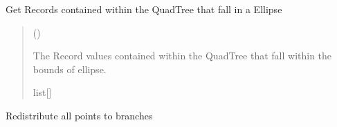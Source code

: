 \documentclass[letterpaper,10pt,english]{sphinxmanual}
\begin{document}
\begin{fulllineitems}

\begin{fulllineitems}
\label{\detokenize{quadtree:geotrees.quadtree.QuadTree.query_ellipse}}
\pysigstartsignatures
\pysiglinewithargsret
{}
{\sphinxparamcomma {}}
{}
\pysigstopsignatures
\sphinxAtStartPar
Get Records contained within the QuadTree that fall in a
Ellipse
\begin{quote}\begin{description}
\sphinxAtStartPar
{} ({\hyperref[\detokenize{shape:geotrees.shape.Ellipse}]{}})

\sphinxAtStartPar
The Record values contained within the QuadTree that fall
within the bounds of ellipse.

\sphinxAtStartPar
list{[}{\hyperref[\detokenize{record:geotrees.record.Record}]{}}{]}

\end{description}\end{quote}

\end{fulllineitems}


\begin{fulllineitems}
\label{\detokenize{quadtree:geotrees.quadtree.QuadTree.redistribute_to_branches}}
\pysigstartsignatures
\pysiglinewithargsret
{}
{}
{}
\pysigstopsignatures
\sphinxAtStartPar
Redistribute all points to branches
\begin{quote}\begin{description}
\sphinxAtStartPar
{}

\end{description}\end{quote}

\end{fulllineitems}


\end{fulllineitems}
\end{document}

